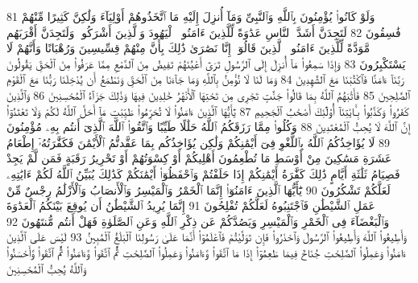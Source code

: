 {\tiny\colorbox{cl_aya}{81}} وَلَوْ كَانُوا۟ يُؤْمِنُونَ بِٱللَّهِ وَٱلنَّبِىِّ وَمَآ أُنزِلَ إِلَيْهِ مَا ٱتَّخَذُوهُمْ أَوْلِيَآءَ وَلَٰكِنَّ كَثِيرًا مِّنْهُمْ فَٰسِقُونَ
{\tiny\colorbox{cl_aya}{82}} لَتَجِدَنَّ أَشَدَّ ٱلنَّاسِ عَدَٰوَةً لِّلَّذِينَ ءَامَنُوا۟ ٱلْيَهُودَ وَٱلَّذِينَ أَشْرَكُوا۟ وَلَتَجِدَنَّ أَقْرَبَهُم مَّوَدَّةً لِّلَّذِينَ ءَامَنُوا۟ ٱلَّذِينَ قَالُوٓا۟ إِنَّا نَصَٰرَىٰ ذَٰلِكَ بِأَنَّ مِنْهُمْ قِسِّيسِينَ وَرُهْبَانًا وَأَنَّهُمْ لَا يَسْتَكْبِرُونَ
{\tiny\colorbox{cl_aya}{83}} وَإِذَا سَمِعُوا۟ مَآ أُنزِلَ إِلَى ٱلرَّسُولِ تَرَىٰٓ أَعْيُنَهُمْ تَفِيضُ مِنَ ٱلدَّمْعِ مِمَّا عَرَفُوا۟ مِنَ ٱلْحَقِّ يَقُولُونَ رَبَّنَآ ءَامَنَّا فَٱكْتُبْنَا مَعَ ٱلشَّٰهِدِينَ
{\tiny\colorbox{cl_aya}{84}} وَمَا لَنَا لَا نُؤْمِنُ بِٱللَّهِ وَمَا جَآءَنَا مِنَ ٱلْحَقِّ وَنَطْمَعُ أَن يُدْخِلَنَا رَبُّنَا مَعَ ٱلْقَوْمِ ٱلصَّٰلِحِينَ
{\tiny\colorbox{cl_aya}{85}} فَأَثَٰبَهُمُ ٱللَّهُ بِمَا قَالُوا۟ جَنَّٰتٍ تَجْرِى مِن تَحْتِهَا ٱلْأَنْهَٰرُ خَٰلِدِينَ فِيهَا وَذَٰلِكَ جَزَآءُ ٱلْمُحْسِنِينَ
{\tiny\colorbox{cl_aya}{86}} وَٱلَّذِينَ كَفَرُوا۟ وَكَذَّبُوا۟ بِـَٔايَٰتِنَآ أُو۟لَٰٓئِكَ أَصْحَٰبُ ٱلْجَحِيمِ
{\tiny\colorbox{cl_aya}{87}} يَٰٓأَيُّهَا ٱلَّذِينَ ءَامَنُوا۟ لَا تُحَرِّمُوا۟ طَيِّبَٰتِ مَآ أَحَلَّ ٱللَّهُ لَكُمْ وَلَا تَعْتَدُوٓا۟ إِنَّ ٱللَّهَ لَا يُحِبُّ ٱلْمُعْتَدِينَ
{\tiny\colorbox{cl_aya}{88}} وَكُلُوا۟ مِمَّا رَزَقَكُمُ ٱللَّهُ حَلَٰلًا طَيِّبًا وَٱتَّقُوا۟ ٱللَّهَ ٱلَّذِىٓ أَنتُم بِهِۦ مُؤْمِنُونَ
{\tiny\colorbox{cl_aya}{89}} لَا يُؤَاخِذُكُمُ ٱللَّهُ بِٱللَّغْوِ فِىٓ أَيْمَٰنِكُمْ وَلَٰكِن يُؤَاخِذُكُم بِمَا عَقَّدتُّمُ ٱلْأَيْمَٰنَ فَكَفَّٰرَتُهُۥٓ إِطْعَامُ عَشَرَةِ مَسَٰكِينَ مِنْ أَوْسَطِ مَا تُطْعِمُونَ أَهْلِيكُمْ أَوْ كِسْوَتُهُمْ أَوْ تَحْرِيرُ رَقَبَةٍ فَمَن لَّمْ يَجِدْ فَصِيَامُ ثَلَٰثَةِ أَيَّامٍ ذَٰلِكَ كَفَّٰرَةُ أَيْمَٰنِكُمْ إِذَا حَلَفْتُمْ وَٱحْفَظُوٓا۟ أَيْمَٰنَكُمْ كَذَٰلِكَ يُبَيِّنُ ٱللَّهُ لَكُمْ ءَايَٰتِهِۦ لَعَلَّكُمْ تَشْكُرُونَ
{\tiny\colorbox{cl_aya}{90}} يَٰٓأَيُّهَا ٱلَّذِينَ ءَامَنُوٓا۟ إِنَّمَا ٱلْخَمْرُ وَٱلْمَيْسِرُ وَٱلْأَنصَابُ وَٱلْأَزْلَٰمُ رِجْسٌ مِّنْ عَمَلِ ٱلشَّيْطَٰنِ فَٱجْتَنِبُوهُ لَعَلَّكُمْ تُفْلِحُونَ
{\tiny\colorbox{cl_aya}{91}} إِنَّمَا يُرِيدُ ٱلشَّيْطَٰنُ أَن يُوقِعَ بَيْنَكُمُ ٱلْعَدَٰوَةَ وَٱلْبَغْضَآءَ فِى ٱلْخَمْرِ وَٱلْمَيْسِرِ وَيَصُدَّكُمْ عَن ذِكْرِ ٱللَّهِ وَعَنِ ٱلصَّلَوٰةِ فَهَلْ أَنتُم مُّنتَهُونَ
{\tiny\colorbox{cl_aya}{92}} وَأَطِيعُوا۟ ٱللَّهَ وَأَطِيعُوا۟ ٱلرَّسُولَ وَٱحْذَرُوا۟ فَإِن تَوَلَّيْتُمْ فَٱعْلَمُوٓا۟ أَنَّمَا عَلَىٰ رَسُولِنَا ٱلْبَلَٰغُ ٱلْمُبِينُ
{\tiny\colorbox{cl_aya}{93}} لَيْسَ عَلَى ٱلَّذِينَ ءَامَنُوا۟ وَعَمِلُوا۟ ٱلصَّٰلِحَٰتِ جُنَاحٌ فِيمَا طَعِمُوٓا۟ إِذَا مَا ٱتَّقَوا۟ وَّءَامَنُوا۟ وَعَمِلُوا۟ ٱلصَّٰلِحَٰتِ ثُمَّ ٱتَّقَوا۟ وَّءَامَنُوا۟ ثُمَّ ٱتَّقَوا۟ وَّأَحْسَنُوا۟ وَٱللَّهُ يُحِبُّ ٱلْمُحْسِنِينَ
